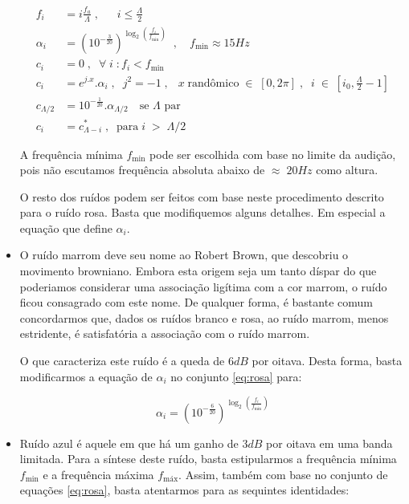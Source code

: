 \begin{itemize}
\begin{equation}\label{eq:rosa}
\begin{split}
f_i & = i \frac{f_a}{\Lambda} \;, \;\; \quad i \leq \frac{\Lambda}{2} \\
\alpha_i & = (10^{-\frac{3}{20}})^{\log _2 \left ( \frac{f_i}{f_{\text{min}}} \right )} \;\;, \quad f_{\text{min}} \approx 15 Hz \\
c_i & =0\;,\;\; \forall \; i \; : f_i<f_{\text{min}} \\
c_i & =e^{j.x} . \alpha_i\;,\;\; j^2=-1 \;, \;\;\  x \; \text{randômico} \; \in \; [0,2\pi]\;,\;\; i \; \in \; [i_0, \frac{\Lambda}{2}-1] \\
c_{\Lambda/2} & = 10^{-\frac{1}{20}} . \alpha_{\Lambda/2} \quad \text{se $\Lambda$ par}\\ 
c_i & = c_{\Lambda - i}^*\;,\;\; \text{para}\;  i \; > \;  \Lambda/2
\end{split}
\end{equation}

A frequência mínima $f_{\text{min}}$ pode ser escolhida com base no limite da audição, pois não escutamos frequência absoluta abaixo de $\approx\; 20Hz$ como altura.

O resto dos ruídos podem ser feitos com base neste procedimento descrito para 
o ruído rosa. Basta que modifiquemos alguns detalhes. Em especial a equação que define $\alpha_i$.

\item O ruído marrom deve seu nome ao Robert Brown, que descobriu o movimento browniano.
Embora esta origem seja um tanto díspar do que poderiamos considerar uma associação ligítima com a cor marrom, o ruído ficou consagrado com este nome. De qualquer forma, é bastante comum concordarmos que, dados os ruídos branco e rosa, ao ruído marrom, menos estridente,
é satisfatória a associação com o ruído marrom.

O que caracteriza este ruído é a queda de $6dB$ por oitava. Desta forma, basta modificarmos a equação de $\alpha_i$ 
no conjunto \ref{eq:rosa} para:

\begin{equation}\label{eq:marrom}
\alpha_i=(10^{-\frac{6}{20}})^{\log _2 \left( \frac{f_i}{f_{\text{min}}} \right )}
\end{equation}

\item Ruído azul é aquele em que há um ganho de $3dB$ por oitava em uma banda limitada. Para
a síntese deste ruído, basta estipularmos a frequência mínima $f_{\text{min}}$ e a frequência
máxima $f_{\text{máx}}$. Assim, também com base no conjunto de equações \ref{eq:rosa}, 
basta atentarmos para as sequintes identidades:


\end{itemize}
